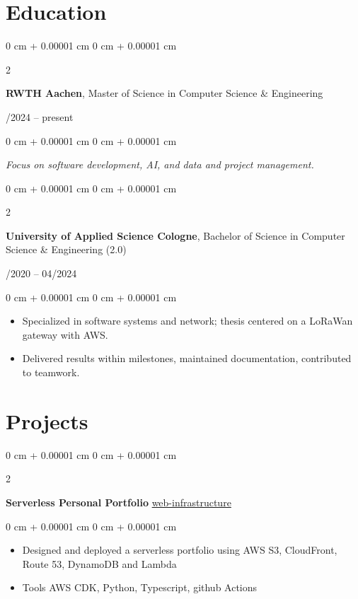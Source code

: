 \documentclass[10pt, letterpaper]{article}
\newenvironment{highlights}{
    \begin{itemize}[
        topsep=0.10 cm,
        parsep=0.10 cm,
        partopsep=0pt,
        itemsep=0pt,
        leftmargin=0 cm + 10pt
    ]
}{
    \end{itemize}
} %
\newenvironment{onecolentry}{
    \begin{adjustwidth}{
        0 cm + 0.00001 cm
    }{
        0 cm + 0.00001 cm
    }
}{
    \end{adjustwidth}
} %
\newenvironment{twocolentry}[2][]{
    \onecolentry
    \def\secondColumn{#2}
    \setcolumnwidth{\fill, 4.5 cm}
    \begin{paracol}{2}
}{
    \switchcolumn \raggedleft \secondColumn
    \end{paracol}
    \endonecolentry
} %
\begin{document}
  \section{Education}
\begin{twocolentry}{04/2024 -- present}
\textbf{RWTH Aachen}, Master of Science in Computer Science \& Engineering
\end{twocolentry}
\begin{onecolentry}
\textit{Focus on software development, AI, and data and project management.}
\end{onecolentry}

\vspace{0.1cm}

\begin{twocolentry}{09/2020 -- 04/2024}
\textbf{University of Applied Science Cologne}, Bachelor of Science in Computer Science \& Engineering (2.0)
\end{twocolentry}
\begin{onecolentry}
\begin{highlights}
\item Specialized in software systems and network; thesis centered on a LoRaWan gateway with AWS.
\item Delivered results within milestones, maintained documentation, contributed to teamwork.
\end{highlights}
\end{onecolentry}



    \section{Projects}        
        \begin{twocolentry}{
           \href{https://github.com/aalhousseini/web-infrastructure}{web-infrastructure}
        }
            \textbf{Serverless Personal Portfolio}\end{twocolentry}
        \vspace{0.10 cm}
        \begin{onecolentry}
            \begin{highlights}
                \item Designed and deployed a serverless portfolio using AWS S3, CloudFront, Route 53, DynamoDB and Lambda
                \item Tools AWS CDK, Python, Typescript, github Actions
            \end{highlights}
        \end{onecolentry}
\end{document}
